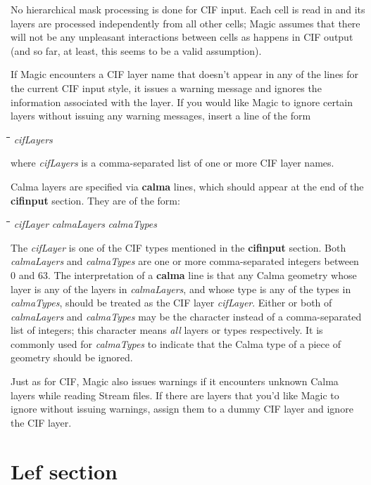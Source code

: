 \documentclass[letterpaper,twoside,12pt]{article}
\def\hinch{\hspace*{0.5in}}
\def\starti{\begin{center}\begin{tabbing}\hinch\=\hinch\=\hinch\=\hinch\=\kill}
\def\endi{\end{tabbing}\end{center}}
\def\ii{\>\>\>}
\begin{document}
No hierarchical mask processing is done for CIF input.  Each cell
is read in and its layers are processed independently
from all other cells;  Magic assumes that there
will not be any unpleasant interactions between cells as happens
in CIF output (and so far, at least, this seems to be a valid
assumption).

If Magic encounters a CIF layer name that doesn't appear
in any of the lines for the current CIF input style, it
issues a warning message and ignores the information associated
with the layer.  If you would like Magic to ignore certain
layers without issuing any warning messages, insert a line
of the form

\starti
   \ii {\bfseries ignore} {\itshape cifLayers}
\endi

where {\itshape cifLayers} is a comma-separated list of one or
more CIF layer names.

Calma layers are specified via {\bfseries calma} lines, which should appear
at the end of the {\bfseries cifinput} section.  They are of the form:

\starti
   \ii {\bfseries calma} {\itshape cifLayer} {\itshape calmaLayers}
	{\itshape calmaTypes}
\endi

The {\itshape cifLayer} is one of the CIF types mentioned in the {\bfseries cifinput}
section.  Both {\itshape calmaLayers} and {\itshape calmaTypes} are one or more
comma-separated integers between 0 and 63.  The interpretation of
a {\bfseries calma} line is that any Calma geometry whose layer is any
of the layers in {\itshape calmaLayers}, and whose type is any of the
types in {\itshape calmaTypes}, should be treated as the CIF layer
{\itshape cifLayer}.
Either or both of {\itshape calmaLayers} and {\itshape calmaTypes} may be
the character {\bfseries *} instead of a comma-separated list of integers;
this character means {\itshape all} layers or types respectively.
It is commonly used for {\itshape calmaTypes} to indicate that the
Calma type of a piece of geometry should be ignored.

Just as for CIF, Magic also issues warnings if it encounters
unknown Calma layers while reading Stream files.  If there are
layers that you'd like Magic to ignore without issuing warnings,
assign them to a dummy CIF layer and ignore the CIF layer.

\section{Lef section}
\end{document}
